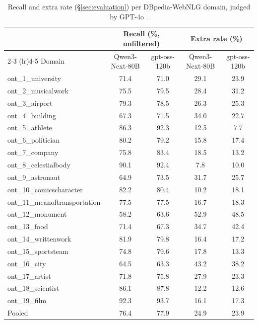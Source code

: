 \documentclass[11pt]{article}
\begin{document}
\begin{table}[t]
\centering
\small
\begin{tabular}{lcccc}
\toprule
& \multicolumn{2}{c}{Recall (\%, unfiltered)} & \multicolumn{2}{c}{Extra rate (\%)} \\
\cmidrule(lr){2-3} \cmidrule(lr){4-5}
Domain & Qwen3-Next-80B & gpt-oss-120b & Qwen3-Next-80B & gpt-oss-120b \\
\midrule
ont\_1\_university            & 71.4 & 71.0 & 29.1 & 23.9 \\
ont\_2\_musicalwork           & 75.5 & 79.5 & 28.4 & 31.2 \\
ont\_3\_airport               & 79.3 & 78.5 & 26.3 & 25.3 \\
ont\_4\_building              & 67.3 & 71.5 & 34.0 & 22.7 \\
ont\_5\_athlete               & 86.3 & 92.3 & 12.5 & 7.7  \\
ont\_6\_politician            & 80.2 & 79.2 & 15.8 & 17.4 \\
ont\_7\_company               & 75.8 & 83.4 & 18.5 & 13.2 \\
ont\_8\_celestialbody         & 90.1 & 92.4 & 7.8  & 10.0 \\
ont\_9\_astronaut             & 64.9 & 73.5 & 31.7 & 25.7 \\
ont\_10\_comicscharacter      & 82.2 & 80.4 & 10.2 & 18.1 \\
ont\_11\_meanoftransportation & 77.5 & 77.5 & 16.7 & 18.3 \\
ont\_12\_monument             & 58.2 & 63.6 & 52.9 & 48.5 \\
ont\_13\_food                 & 71.4 & 67.3 & 34.7 & 42.4 \\
ont\_14\_writtenwork          & 81.9 & 79.8 & 16.4 & 17.2 \\
ont\_15\_sportsteam           & 74.8 & 79.6 & 17.8 & 13.3 \\
ont\_16\_city                 & 64.5 & 63.3 & 43.2 & 38.2 \\
ont\_17\_artist               & 71.8 & 75.8 & 27.9 & 23.3 \\
ont\_18\_scientist            & 86.1 & 87.8 & 12.2 & 12.6 \\
ont\_19\_film                 & 92.3 & 93.7 & 16.1 & 17.3 \\
\midrule
Pooled & 76.4 & 77.9 & 24.9 & 23.9 \\
\bottomrule
\end{tabular}
\caption{Recall and extra rate (\S\ref{sec:evaluation}) per DBpedia-WebNLG domain, judged by GPT-4o \citep{openai2024gpt4o}.}
\label{tab:dbpedia-webnlg-separate}
\end{table}
\end{document}
